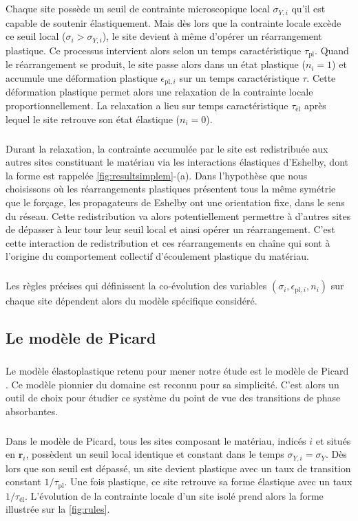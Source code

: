 \subparagraph{}Chaque site possède un seuil de contrainte microscopique local $\sigma_{Y,i}$ qu'il est capable de soutenir élastiquement. Mais dès lors que la contrainte locale excède ce seuil local ($\sigma_i > \sigma_{Y,i}$), le site devient à même d'opérer un réarrangement plastique. Ce processus intervient alors selon un temps caractéristique $\tau_{\text{pl}}$. Quand le réarrangement se produit, le site passe alors dans un état plastique ($n_i = 1$) et accumule une déformation plastique $\epsilon_{\text{pl},i}$ sur un temps caractéristique $\tau$. Cette déformation plastique permet alors une relaxation de la contrainte locale proportionnellement. La relaxation a lieu sur temps caractéristique $\tau_{\text{él}}$ après lequel le site retrouve son état élastique ($n_i = 0$).

\subparagraph{}Durant la relaxation, la contrainte accumulée par le site est redistribuée aux autres sites constituant le matériau via les interactions élastiques d'Eshelby, dont la forme est rappelée \autoref{fig:resultsimplem}-(a). Dans l'hypothèse que nous choisissons où les réarrangements plastiques présentent tous la même symétrie que le forçage, les propagateurs de Eshelby ont une orientation fixe, dans le sens du réseau. Cette redistribution va alors potentiellement permettre à d'autres sites de dépasser à leur tour leur seuil local et ainsi opérer un réarrangement. C'est cette interaction de redistribution et ces réarrangements en chaîne qui sont à l'origine du comportement collectif d'écoulement plastique du matériau.

\subparagraph{}Les règles précises qui définissent la co-évolution des variables $(\sigma_i, \epsilon_{\text{pl},i}, n_i)$ sur chaque site dépendent alors du modèle spécifique considéré.

\subsection{Le modèle de Picard}

\subparagraph{}Le modèle élastoplastique retenu pour mener notre étude est le modèle de Picard \cite{picard_slow_2005}. Ce modèle pionnier du domaine est reconnu pour sa simplicité. C'est alors un outil de choix pour étudier ce système du point de vue des transitions de phase absorbantes.

\subparagraph{}Dans le modèle de Picard, tous les sites composant le matériau, indicés $i$ et situés en $\mathbf{r}_i$, possèdent un seuil local identique et constant dans le temps $\sigma_{Y,i}=\sigma_Y$. Dès lors que son seuil est dépassé, un site devient plastique avec un taux de transition constant $1/\tau_ {\text{pl}}$. Une fois plastique, ce site retrouve sa forme élastique avec un taux $1/\tau_ {\text{él}}$. L'évolution de la contrainte locale d'un site isolé prend alors la forme illustrée sur la \autoref{fig:rules}.

